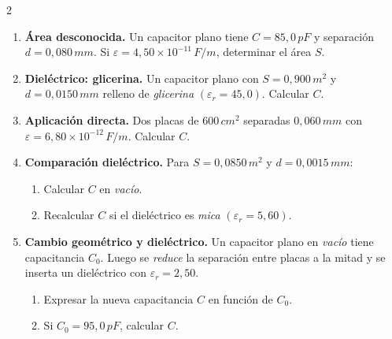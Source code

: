 \documentclass[a4paper,10pt]{article}
\begin{document}
\begin{multicols}{2}
\begin{enumerate}
\item \textbf{Área desconocida.} Un capacitor plano tiene \(C=85,0\,\si{pF}\) y separación \(d=0,080\,\si{mm}\). Si \(\varepsilon=4,50\times 10^{-11}\,\si{F/m}\), determinar el área \(S\).

\item \textbf{Dieléctrico: glicerina.} Un capacitor plano con \(S=0,900\,\si{m^2}\) y \(d=0,0150\,\si{mm}\) relleno de \textit{glicerina} \(\left(\varepsilon_r=45,0\right)\). Calcular \(C\).

\item \textbf{Aplicación directa.} Dos placas de \(600\,\si{cm^2}\) separadas \(0,060\,\si{mm}\) con \(\varepsilon=6,80\times 10^{-12}\,\si{F/m}\). Calcular \(C\).

\item \textbf{Comparación dieléctrico.} Para \(S=0,0850\,\si{m^2}\) y \(d=0,0015\,\si{mm}\):
\begin{enumerate}
\item Calcular \(C\) en \textit{vacío}.
\item Recalcular \(C\) si el dieléctrico es \textit{mica} \(\left(\varepsilon_r=5,60\right)\).
\end{enumerate}

\item \textbf{Cambio geométrico y dieléctrico.} Un capacitor plano en \textit{vacío} tiene capacitancia \(C_0\).
Luego se \emph{reduce} la separación entre placas a la mitad y se inserta un dieléctrico con \(\varepsilon_r=2,50\).
\begin{enumerate}
\item Expresar la nueva capacitancia \(C\) en función de \(C_0\).
\item Si \(C_0=95,0\,\si{pF}\), calcular \(C\).
\end{enumerate}

\end{enumerate}

\end{multicols}
\end{document}
